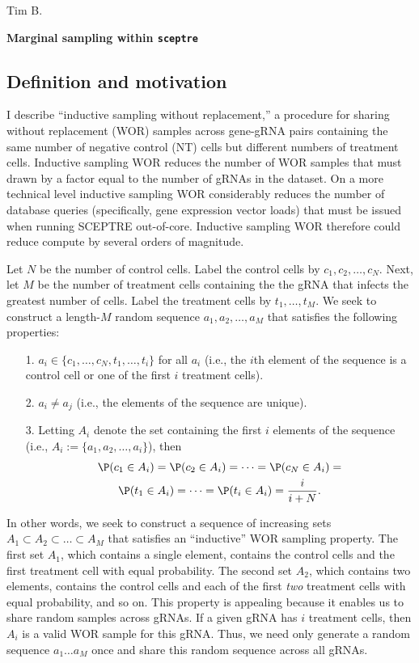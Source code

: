 \documentclass[12pt]{article}
\begin{document}
\noindent
Tim B.

\begin{center}
\textbf{Marginal sampling within \texttt{sceptre}}
\end{center}

\subsection*{Definition and motivation}

I describe ``inductive sampling without replacement,'' a procedure for sharing without replacement (WOR) samples across gene-gRNA pairs containing the same number of negative control (NT) cells but different numbers of treatment cells. Inductive sampling WOR reduces the number of WOR samples that must drawn by a factor equal to the number of gRNAs in the dataset. On a more technical level inductive sampling WOR considerably reduces the number of database queries (specifically, gene expression vector loads) that must be issued when running SCEPTRE out-of-core. Inductive sampling WOR therefore could reduce compute by several orders of magnitude.

Let $N$ be the number of control cells. Label the control cells by $c_1, c_2, \dots, c_N$. Next, let $M$ be the number of treatment cells containing the the gRNA that infects the greatest number of cells. Label the treatment cells by $t_1, \dots, t_M$. We seek to construct a length-$M$ random sequence $a_1, a_2, \dots, a_M$ that satisfies the following properties:
\begin{itemize}
\item[1.] $a_i \in \{ c_1, \dots, c_N, t_1, \dots, t_i \} $ for all $a_i$ (i.e., the $i$th element of the sequence is a control cell or one of the first $i$ treatment cells).
\item[2.] $a_i \neq a_j$ (i.e., the elements of the sequence are unique).
\item[3.] Letting $A_i$ denote the set containing the first $i$ elements of the sequence (i.e., $A_i := \{ a_1, a_2, \dots, a_i \}$), then
\begin{multline*}
\P(c_1 \in A_i) = \P(c_2 \in A_i) = \dots = \P(c_N \in A_i) = \\ \P(t_1 \in A_i) = \dots = \P(t_i \in A_i) = \frac{i}{i + N}.
\end{multline*}
\end{itemize}

In other words, we seek to construct a sequence of increasing sets $A_1 \subset A_2 \subset \dots \subset A_M$ that satisfies an ``inductive'' WOR sampling property. The first set $A_1$, which contains a single element, contains the control cells and the first treatment cell with equal probability. The second set $A_2$, which contains two elements, contains the control cells and each of the first \textit{two} treatment cells with equal probability, and so on. This property is appealing because it enables us to share random samples across gRNAs. If a given gRNA has $i$ treatment cells, then $A_i$ is a valid WOR sample for this gRNA. Thus, we need only generate a random sequence $a_1 \dots a_M$ once and share this random sequence across all gRNAs.
\end{document}
